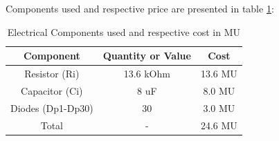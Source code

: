 \vspace{-6mm}
Components used and respective price are presented in table \ref{tab:material}:
\vspace{5mm}
\begin{table}[ht]
    \centering
    \begin{tabular}{|c|c|c|}
      \hline    
      {\bf Component} & {\bf Quantity or Value} & {\bf Cost} \\ \hline
      Resistor (Ri) & 13.6 kOhm & 13.6 MU \\ \hline
      Capacitor (Ci) & 8 uF & 8.0 MU \\ \hline
      Diodes (Dp1-Dp30) & 30 & 3.0 MU \\ \hline
      Total & - & 24.6 MU \\ \hline
    \end{tabular}
    \vspace{5mm}
    \caption{Electrical Components used and respective cost in MU}
    \label{tab:material}
  \end{table}